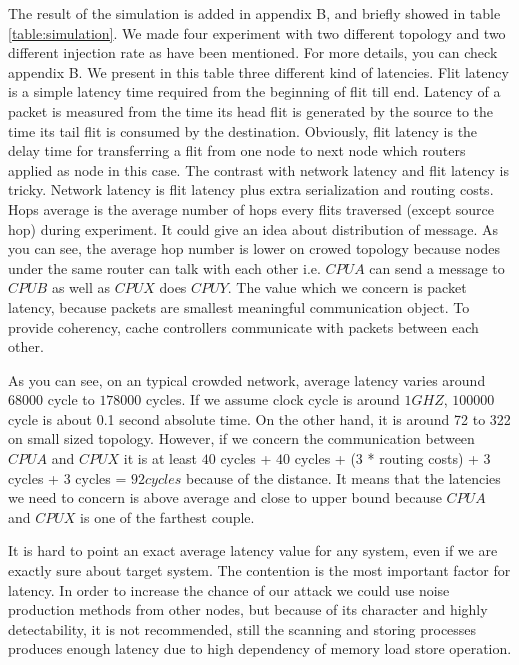 The result of the simulation is added in appendix B, and briefly showed in table \ref{table:simulation}. We made four experiment with two different topology and two different injection rate as have been mentioned. For more details, you can check appendix B. We present in this table three different kind of latencies. Flit latency is a simple latency time required from the beginning of flit till end. Latency of a packet is measured from the time its head flit is generated by the source to the time its tail flit is consumed by the destination. Obviously, flit latency is the delay time for transferring a flit from one node to next node which routers applied as node in this case. The contrast with network latency and flit latency is tricky. Network latency is flit latency plus extra serialization and routing costs. Hops average is the average number of hops every flits traversed (except source hop) during experiment. It could give an idea about distribution of message. As you can see, the average hop number is lower on crowed topology because nodes under the same router can talk with each other i.e. $CPUA$ can send a message to $CPUB$ as well as $CPUX$ does $CPUY$. The value which we concern is packet latency, because packets are smallest meaningful communication object. To provide coherency, cache controllers communicate with packets between each other. 

As you can see, on an typical crowded network, average latency varies around $68000$ cycle to $178000$ cycles. If we assume clock cycle is around $1 GHZ$, $100000$ cycle is about 0.1 second absolute time. On the other hand, it is around 72 to 322 on small sized topology. However, if we concern the communication between $CPUA$ and $CPUX$ it is at least $40$ cycles + $40$ cycles + (3 * routing costs) + $3$ cycles + $3$ cycles = $92 cycles$ because of the distance. It means that the latencies we need to concern is above average and close to upper bound because $CPUA$ and $CPUX$ is one of the farthest couple.

It is hard to point an exact average latency value for any system, even if we are exactly sure about target system. The contention is the most important factor for latency. In order to increase the chance of our attack we could use noise production methods from other nodes, but because of its character and highly detectability, it is not recommended, still the scanning and storing processes produces enough latency due to high dependency of memory load store operation. 

